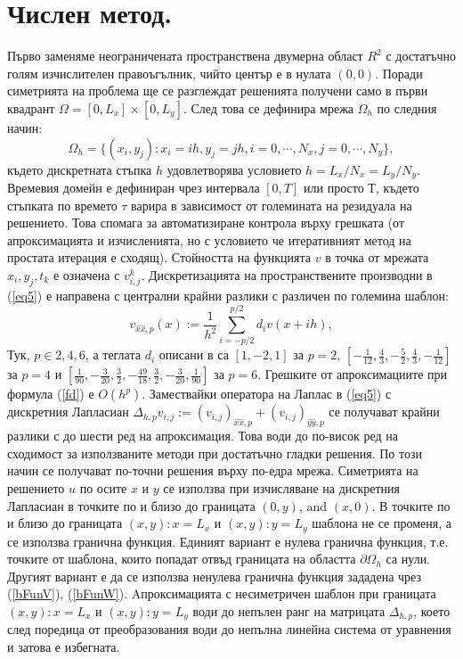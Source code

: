 \documentclass{article}
\newcommand{\rf}[1]{(\ref{#1})}
\begin{document}
\section{Числен метод.}
Първо заменяме неограничената пространствена двумерна област $R^2$ с достатъчно голям изчислителен правоъгълник, чийто център е в нулата $(0,0)$. Поради симетрията на проблема ще се разглеждат решенията получени само в първи квадрант $\Omega = [0,L_x] \times[0,L_y]$. След това се дефинира мрежа $\Omega_h$ по следния начин:
$$
\Omega_h = \{(x_i,y_j): x_i = ih, y_j = jh, i = 0,\cdots ,N_x, j = 0,\cdots , N_y \},
$$
където дискретната стъпка $h$ удовлетворява условието
$ h = L_x/N_x = L_y/N_y$.  Времевия домейн е дефиниран чрез интервала $[0, T]$ или просто $Т$, където стъпката по времето $\tau$ варира в зависимост от големината на резидуала на решението. Това спомага за автоматизиране контрола върху грешката (от апроксимацията и изчисленията, но с условието че итеративният метод на простата итерация е сходящ). Стойността на функцията $v$ в точка от мрежата $x_i,y_j,t_k$ е означена с $v_{i,j}^k$.
Дискретизацията на пространствените производни в \rf{eq5} е направена с централни крайни разлики с различен по големина шаблон:
\begin{equation}\label{fd}
v_{\widehat{xx},p}(x) :=  \frac{1}{h^2} \sum\limits_{i=-p/2}^{p/2} d_i v(x+ih),
\end{equation}
Тук, $p \in {2, 4, 6}$, а теглата $d_i$ описани в \cite{forn} са 
 $[1,-2,1]$ за $p=2$, $[-\frac{1}{12}, \frac{4}{3}, -\frac{5}{2}, \frac{4}{3}, -\frac{1}{12}]$ за $p=4$ и  $[\frac{1}{90}, -\frac{3}{20}, \frac{3}{2}, -\frac{49}{18}, \frac{3}{2}, -\frac{3}{20}, \frac{1}{90}]$ за $p=6$. Грешките от апроксимациите при формула \rf{fd} е $O(h^p)$. Замествайки оператора на Лаплас в \rf{eq5} с дискретния Лапласиан $\Delta_{h,p} v_{i,j} := (v_{i,j})_{\widehat{xx},p} + (v_{i,j})_{\widehat{yy},p}$ се получават крайни разлики с до шести ред на апроксимация. Това води до по-висок ред на сходимост за използваните методи при достатъчно гладки решения. По този начин се получават по-точни решения върху по-едра мрежа.
Симетрията на решението $u$ по осите $x$ и $y$ се използва при изчисляване на дискретния Лапласиан в точките по и близо до границата ${(0,y)}$, and $(x,0)$. 
В точките по и близо до границата $(x,y):x=L_x$ и $(x,y):y=L_y$ шаблона не се променя, а се използва гранична функция. Единият вариант е нулева гранична функция, т.е. точките от шаблона, които попадат отвъд границата на областта $\partial \Omega_h$ са нули. Другият вариант е да се използва ненулева гранична функция зададена чрез \rf{bFunV}, \rf{bFunW}. Aпроксимацията с несиметричен шаблон при границата $(x,y):x=L_x$ и $(x,y):y=L_y$ води до непълен ранг на матрицата $\Delta_{h,p}$, което след поредица от преобразования води до непълна линейна система от уравнения и затова е избегната.
\end{document}
